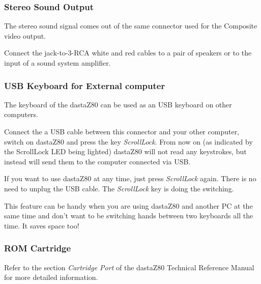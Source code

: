         \subsubsection{Stereo Sound Output}

        The stereo sound signal comes out of the same connector used for the
        Composite video output.

        Connect the jack-to-3-RCA white and red cables to a pair of speakers or
        to the input of a sound system amplifier.

        \subsubsection{USB Keyboard for External computer}

        The keyboard of the dastaZ80 can be used as an USB keyboard on other
        computers.
        
        Connect the a USB cable between this connector and your other
        computer, switch on dastaZ80 and press the key \textit{ScrollLock}. From
        now on (as indicated by the ScrollLock LED being lighted) dastaZ80 will
        not read any keystrokes, but instead will send them to the computer
        connected via USB.

        If you want to use dastaZ80 at any time, just press \textit{ScrollLock}
        again. There is no need to unplug the USB cable. The \textit{ScrollLock}
        key is doing the switching.

        This feature can be handy when you are using dastaZ80 and another PC at
        the same time and don't want to be switching hands between two keyboards
        all the time. It saves space too!

        \subsubsection{ROM Cartridge}

        Refer to the section \textit{Cartridge Port} of the dastaZ80 Technical
        Reference Manual\cite{dastaz80techman} for more detailed information.

